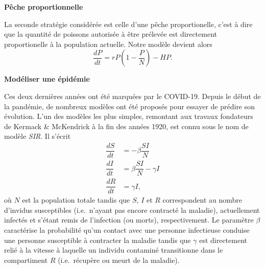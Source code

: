 \documentclass[12pt]{exam}
\begin{document}
\begin{questions}
  \bigskip

  \textbf{Pêche proportionnelle}

  La seconde stratégie considérée est celle d'une pêche proportionelle, c'est à dire que la quantité de poissons autorisée à être prélevée est directement proportionelle à la population actuelle.
  Notre modèle devient alors
  \[
  \dfrac{dP}{dt} = r P \left( 1 - \dfrac{P}{N} \right) - HP.
  \]

  \addpoints

  \question[10] \textbf{Modéliser une épidémie}
  \noaddpoints

  Ces deux dernières années ont été marquées par le COVID-19.
  Depuis le début de la pandémie, de nombreux modèles ont été proposés pour essayer de prédire son évolution.
  L'un des modèles les plus simples, remontant aux travaux fondateurs de Kermack \& McKendrick à la fin des années 1920, est connu sous le nom de modèle \emph{SIR}.
  Il s'écrit
  \[
  \begin{aligned}
    \dfrac{dS}{dt} & = - \beta \dfrac{SI}{N} \\
    \dfrac{dI}{dt} & = \beta \dfrac{SI}{N} - \gamma I \\
    \dfrac{dR}{dt} & = \gamma I,
  \end{aligned}
  \]
  où $N$ est la population totale tandis que $S$, $I$ et $R$ correspondent au nombre d'invidus susceptibles (i.e.\ n'ayant pas encore contracté la maladie), actuellement infectés et s'étant remis de l'infection (ou morts), respectivement.
  Le paramètre $\beta$ caractérise la probabilité qu'un contact avec une personne infectieuse conduise une personne susceptible à contracter la maladie tandis que $\gamma$ est directement relié à la vitesse à laquelle un individu contaminé transitionne dans le compartiment $R$ (i.e.\ récupère ou meurt de la maladie).


\end{questions}
\end{document}
